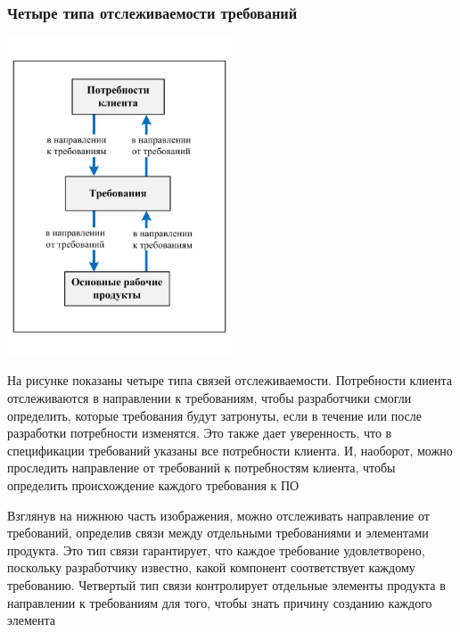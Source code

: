 \documentclass{../industrial-development}
\begin{document}
\begin{frame} \frametitle{Четыре типа отслеживаемости требований }
 \centerline{\includegraphics[width=0.5\textwidth]{pic2.pdf}}
\end{frame}

\lecturenotes

На рисунке показаны четыре типа связей отслеживаемости. Потребности клиента отслеживаются в направлении к требованиям, чтобы разработчики смогли определить, которые требования будут затронуты, если в течение или после разработки потребности изменятся. Это также дает уверенность, что в спецификации требований указаны все потребности клиента. И, наоборот, можно проследить направление от требований к потребностям клиента, чтобы определить происхождение каждого требования к ПО

Взглянув на нижнюю часть изображения, можно отслеживать направление от требований, определив связи между отдельными требованиями и элементами продукта. Это тип связи гарантирует, что каждое требование удовлетворено, поскольку разработчику известно, какой компонент соответствует каждому требованию. Четвертый тип связи контролирует отдельные элементы продукта в направлении к требованиям для того, чтобы знать причину созданию каждого элемента~\cite[с.~385--386]{Wiegers}
\end{document}
